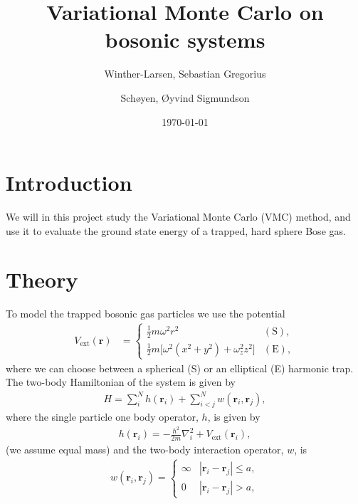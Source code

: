 \documentclass[
    a4paper, aps, twocolumn, floatfix, superscriptaddress]{revtex4-1}
\newcommand{\vf}{\mathbf}
\newcommand{\1}{\mathds{1}}
\newcommand{\half}{\frac{1}{2}}
\begin{document}
\title{Variational Monte Carlo on bosonic systems}
\author{Winther-Larsen, Sebastian Gregorius}
\author{Schøyen, Øyvind Sigmundson}
\date{\today}

\maketitle

\section{Introduction}
    We will in this project study the Variational Monte Carlo (VMC) method, and
    use it to evaluate the ground state energy of a trapped, hard sphere Bose
    gas.

\section{Theory}
    To model the trapped bosonic gas particles we use the potential
    \begin{align}
        V_{\text{ext}}(\vf{r})
        &=
        \begin{cases}
            \half m\omega^2r^2 & (\text{S}), \\
            \half m \bigl[
                \omega^2(x^2 + y^2) + \omega_z^2z^2
            \bigr] & (\text{E}),
        \end{cases}
    \end{align}
    where we can choose between a spherical (S) or an elliptical (E) harmonic
    trap. The two-body Hamiltonian of the system is given by
    \begin{align}
        H = \sum_{i}^{N}h(\vf{r}_i) + \sum_{i < j}^{N}w(\vf{r}_i, \vf{r}_j),
    \end{align}
    where the single particle one body operator, $h$, is given by
    \begin{align}
        h(\vf{r}_i) = -\frac{\hbar^2}{2m}\nabla_i^2
        + V_{\text{ext}}(\vf{r}_i),
    \end{align}
    (we assume equal mass)
    and the two-body interaction operator, $w$, is
    \begin{align}
        w(\vf{r}_i, \vf{r}_j)
        = \begin{cases}
            \infty & |\vf{r}_i - \vf{r}_j| \leq a, \\
            0 & |\vf{r}_i - \vf{r}_j| > a,
        \end{cases}
    \end{align}
\end{document}
